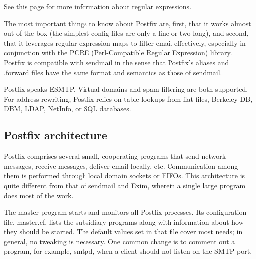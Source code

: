 \leavevmode\hypertarget{part0026_split_057.htmlux5cux23_idContainer1213}{}%
See
\protect\hyperlink{part0014_split_023.htmlux5cux23_idTextAnchor367}{this
page} for more information about regular expressions.

The most important things to know about Postfix are, first, that it
works almost out of the box (the simplest config files are only a line
or two long), and second, that it leverages regular expression maps to
filter email effectively, especially in conjunction with the
\protect\hypertarget{part0026_split_057.htmlux5cux23_idIndexMarker2681}{}{}PCRE
(Perl-Compatible Regular Expression) library. Postfix is compatible with
{sendmail} in the sense that Postfix's {aliases} and {.forward} files
have the same format and semantics as those of {sendmail}.

Postfix speaks ESMTP. Virtual domains and spam filtering are both
supported. For address rewriting, Postfix relies on table lookups from
flat files, Berkeley DB, DBM, LDAP, NetInfo, or SQL databases.

\protect\hypertarget{part0026_split_058.html}{}{}

\hypertarget{part0026_split_058.htmlux5cux23_idContainer1247}{}
\hypertarget{part0026_split_058.htmlux5cux23calibre_pb_57}{%
\subsection[Postfix
architecture]{\texorpdfstring{\protect\hypertarget{part0026_split_058.htmlux5cux23_idTextAnchor1165}{}{}Postfix
architecture}{Postfix architecture}}\label{part0026_split_058.htmlux5cux23calibre_pb_57}}

\protect\hypertarget{part0026_split_058.htmlux5cux23_idIndexMarker2682}{}{}Postfix
comprises several small, cooperating programs that send network
messages, receive messages, deliver email locally, etc. Communication
among them is performed through local domain sockets or FIFOs. This
architecture is quite different from that of {sendmail} and Exim,
wherein a single large program does most of the work.

The {master} program starts and monitors all Postfix processes. Its
configuration file, {master.cf}, lists the subsidiary programs along
with information about how they should be started. The default values
set in that file cover most needs; in general, no tweaking is necessary.
One common change is to comment out a program, for example, {smtpd},
when a client should not listen on the SMTP port.

